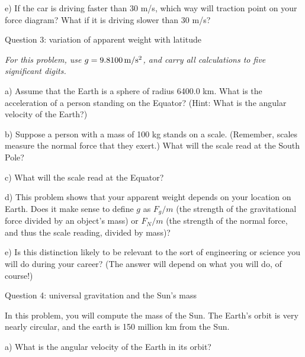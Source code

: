 \documentclass[12pt]{article}
\begin{document}
\vspace{3in}

e) If the car is driving faster than 30 m/s, which way will traction point on your force diagram?
What if it is driving slower than 30 m/s? 

\newpage

\centerline{\Large Question 3: variation of apparent weight with latitude}

\medskip

\centerline{\it For this problem, use $g=9.8100\, \rm m/\rm s^2$, and carry all calculations to five significant digits.}

a) Assume that the Earth is a sphere of radius 6400.0 km. What is the acceleration of a person
standing on the Equator? (Hint: What is the angular velocity of the Earth?)

\vspace{2in}

b) Suppose a person with a mass of 100 kg stands on a scale. (Remember, scales measure the
normal force that they exert.) What will the scale read at the South Pole?

\vspace{2in}

c) What will the scale read at the Equator?

\vspace{2in}
\newpage

d) This problem shows that your apparent weight depends on your location on Earth. 
Does it make sense to define $g$ as $F_g/m$ 
(the strength of the gravitational force divided by an object's mass) or
$F_N/m$ (the strength of the normal force, and thus the scale reading, divided by mass)?

\vspace{3in}

e) Is this distinction likely to be relevant to the sort of engineering or science you will do during your
career? (The answer will depend on what you will do, of course!)


\newpage

\centerline{\Large Question 4: universal gravitation and the Sun's mass}

In this problem, you will compute the mass of the Sun. The Earth’s orbit is very nearly circular,
and the earth is 150 million km from the Sun.

a) What is the angular velocity of the Earth in its orbit?

\vspace{2in}
\end{document}
